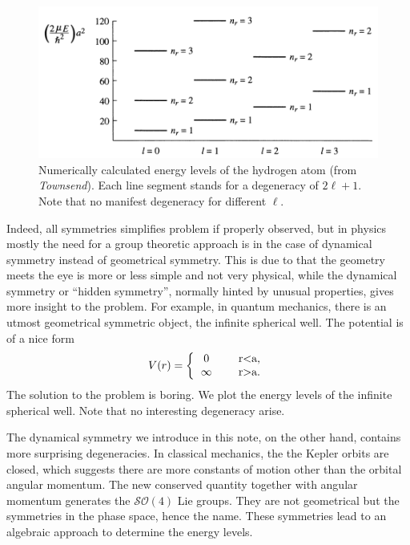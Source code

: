 \documentclass[a4paper,11pt]{article}
\theoremstyle{remark}
\theoremstyle{defn}
\begin{document}
\begin{figure}[h!]
\centering
\includegraphics[width=\linewidth]{well}
\caption{Numerically calculated energy levels of the hydrogen atom (from \textit{Townsend}). 
Each line segment stands for a degeneracy of $2\ell+1$. Note that no manifest degeneracy for different $\ell$.}
\label{fig:well}
\end{figure}
Indeed, all symmetries simplifies problem if properly observed, but in physics mostly the need for a group theoretic approach
is in the case of dynamical symmetry instead of geometrical symmetry. This is due to that the geometry meets the eye is 
more or less simple and not very physical, while the dynamical symmetry or ``hidden symmetry'', normally hinted by unusual
properties, gives more insight to the problem. For example, in quantum mechanics, there is an utmost geometrical
symmetric object, the infinite spherical well. 
The potential is of a nice form 
\begin{equation}
V(r) = 
\left \{
  \begin{tabular}{ccc}
  0 &  & r<a, \\
  $\infty$ &  & r>a.
  \end{tabular}
\right.
\end{equation}
The solution to the problem is boring. We plot the energy levels of the infinite spherical well. Note that 
no interesting degeneracy arise.\par 
The dynamical symmetry we introduce in this note, on the other hand, contains more surprising degeneracies.
In classical mechanics, the the Kepler orbits are closed, which suggests there are more constants of
motion other than the orbital angular momentum. The new conserved quantity together with angular momentum
generates the $\mathcal{SO}(4)$ Lie groups. They are not geometrical but the symmetries in the phase
space, hence the name. These symmetries lead to an algebraic approach to determine the energy
levels.
\end{document}
